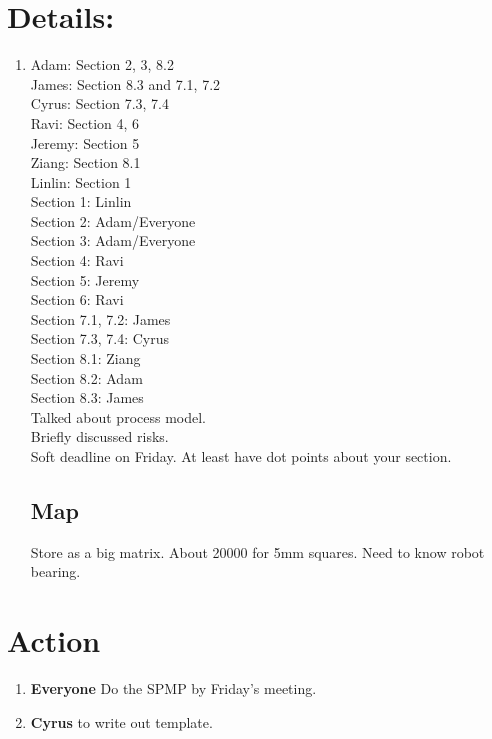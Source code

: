 \documentclass{article}
\begin{document}
\section{Details:}
\begin{enumerate}
\subsection{SPMP Plan}
\item
Adam: Section 2, 3, 8.2\\
James: Section 8.3 and 7.1, 7.2\\
Cyrus: Section 7.3, 7.4 \\
Ravi: Section 4, 6\\
Jeremy: Section 5\\
Ziang: Section 8.1\\
Linlin: Section 1\\
\bigskip
Section 1: Linlin\\
Section 2: Adam/Everyone\\
Section 3: Adam/Everyone\\
Section 4: Ravi\\
Section 5: Jeremy\\
Section 6: Ravi\\
Section 7.1, 7.2: James\\
Section 7.3, 7.4: Cyrus\\
Section 8.1: Ziang\\
Section 8.2: Adam\\
Section 8.3: James\\
\bigskip
Talked about process model.\\
Briefly discussed risks.\\
Soft deadline on Friday. At least have dot points about your section.\\

\subsection {Map}
Store as a big matrix. About 20000 for 5mm squares. Need to know robot bearing. \\

\end{enumerate}

\section{Action}
\begin{enumerate}
\item \textbf{Everyone} Do the SPMP by Friday's meeting.\\
\item \textbf{Cyrus} to write out template.\\
\end{enumerate}
\end{document}
